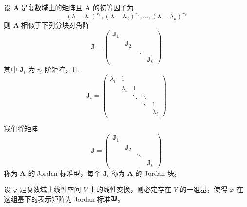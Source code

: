 \begin{theorem}
    设 $\bm{A}$ 是复数域上的矩阵且 $\bm{A}$ 的初等因子为
    \[
        (\lambda - \lambda_1)^{r_1}, (\lambda - \lambda_2)^{r_2}, \ldots, (\lambda - \lambda_k)^{r_k}
    \]
    则 $\bm{A}$ 相似于下列分块对角阵
    \begin{equation}
        \bm{J} = \begin{pmatrix}
            \bm{J}_1 & \        & \      & \        \\
            \        & \bm{J}_2 & \      & \        \\
            \        & \        & \ddots & \        \\
            \        & \        & \      & \bm{J}_k
        \end{pmatrix}
    \end{equation}
    其中 $\bm{J}_i$ 为 $r_i$ 阶矩阵，且
       \begin{equation}
        \bm{J}_i = \begin{pmatrix}
            \lambda_i & 1         & \      & \      & \         \\
            \         & \lambda_i & 1      & \      & \         \\
            \         & \         & \ddots & \ddots & \         \\
            \         & \         & \      & \ddots & 1         \\
            \         & \         & \      & \      & \lambda_i
        \end{pmatrix}
       \end{equation} 
\end{theorem}

\begin{definition}
  我们将矩阵
  \[
        \bm{J} = \begin{pmatrix}
            \bm{J}_1 & \        & \      & \        \\
            \        & \bm{J}_2 & \      & \        \\
            \        & \        & \ddots & \        \\
            \        & \        & \      & \bm{J}_k
        \end{pmatrix}
  \]
  称为 $\bm{A}$ 的 Jordan 标准型，每个 $\bm{J}_i$ 称为 $\bm{A}$ 的 Jordan 块。
\end{definition}

\begin{theorem}
  设 $\varphi$ 是复数域上线性空间 $V$ 上的线性变换，则必定存在 $V$ 的一组基，使得 $\varphi$ 在这组基下的表示矩阵为 Jordan 标准型。
\end{theorem}

